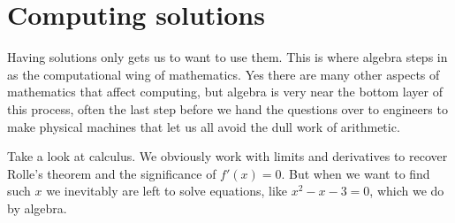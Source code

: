 \section{Computing solutions}
Having solutions only gets us to want to use them.  This is where algebra steps
in as the computational wing of mathematics.  Yes there are many other aspects
of mathematics that affect computing, but algebra is very near the bottom layer
of this process, often the last step before we hand the questions over to
engineers to make physical machines that let us all avoid the dull work of
arithmetic.

Take a look at calculus.
We obviously work with limits and derivatives to recover Rolle's theorem 
and the significance of $f'(x)=0$.  But when we want to find such $x$ we
inevitably are left to solve equations, like $x^2-x-3=0$, which we do by algebra.  

